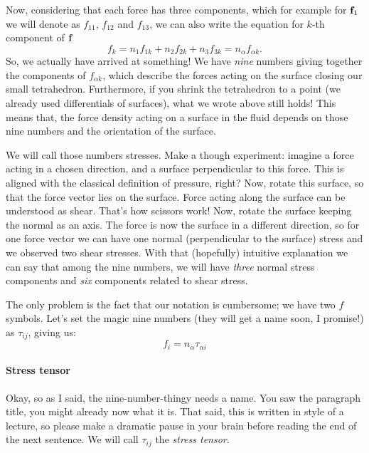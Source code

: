 \documentclass[a4paper]{article}
\begin{document}
Now, considering that each force has three components, which for example for 
\(\vb{f}_1\) we will denote as \(f_{11}\), \(f_{12}\) and \(f_{13}\), we can 
also write the equation for \(k\)-th component of \(\vb{f}\)
\[
  f_k = n_1 f_{1k} + n_2 f_{2k} +n_3 f_{3k} = n_\alpha f_{\alpha k}.
\]
So, we actually have arrived at something! We have \emph{nine} numbers giving
together the components of \(f_{\alpha k}\), which describe the forces acting 
on the surface closing our small tetrahedron. Furthermore, if you shrink the 
tetrahedron to a point (we already used differentials of surfaces), what we 
wrote above still holds! This means that, the force density acting on a surface 
in the fluid depends on those nine numbers and the orientation of the surface.

We will call those numbers stresses. Make a though experiment: imagine a force 
acting in a chosen direction, and a surface perpendicular to this force. This 
is aligned with the classical definition of pressure, right? Now, rotate this 
surface, so that the force vector lies on the surface. Force acting along the 
surface can be understood as shear. That's how scissors work! Now, rotate the 
surface keeping the normal as an axis. The force is now  the 
surface in a different direction, so for one force vector we can have one normal 
(perpendicular to the surface)
stress and we observed two shear stresses. With that (hopefully) intuitive 
explanation we can say that among the nine numbers, we will have \emph{three}
normal stress components and \emph{six} components related to shear stress.

The only problem is the fact that our notation is cumbersome; we have two \(f\)
symbols. Let's set the magic nine numbers (they will get a name soon, I promise!) 
as \(\tau_{ij}\), giving us:
\[
  f_i = n_\alpha \tau_{\alpha i}
\]

\paragraph{Stress tensor}
Okay, so as I said, the nine-number-thingy needs a name. You saw the paragraph
title, you might already now what it is. That said, this is written in style of 
a lecture, so please make a dramatic pause in your brain before reading the end of the 
next sentence. We will call \(\tau_{ij}\) the \emph{stress tensor}. 
\end{document}
